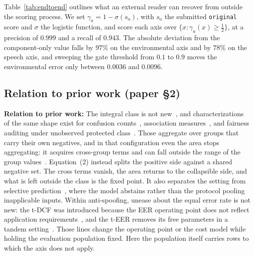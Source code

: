 \documentclass[10pt]{article}
\begin{document}
Table~\ref{tab:endtoend} outlines what an external reader can recover from outside the scoring
process. We set $\gamma_a = 1-\sigma(s_{\mathrm{o}})$, with $s_{\mathrm{o}}$ the submitted
\texttt{original} score and $\sigma$ the logistic function, and score each axis over $\{x:\gamma_a(x)\ge\tfrac12\}$, at a precision of $0.999$ and a recall of
$0.943$. The absolute deviation from the component-only value falls by $97\%$ on the environmental
axis and by $78\%$ on the speech axis, and sweeping the gate threshold from $0.1$ to $0.9$ moves the
environmental error only between $0.0036$ and $0.0096$.

\subsection*{Relation to prior work (paper \S2)}

\noindent\textbf{Relation to prior work: } The integral class is not new~\cite{wieand1989}, and
characterizations of the same shape exist for confusion counts~\cite{prati2026}, association
measures~\cite{kenah2025}, and fairness auditing under unobserved protected
class~\cite{kallus2019}. Those aggregate over groups that carry their own negatives, and in that
configuration even the area stops aggregating: it acquires cross-group terms and can fall outside the
range of the group values~\cite{matos2026}. Equation~(2) instead splits the positive side
against a shared negative set. The cross terms vanish, the area returns to the collapsible side, and
what is left outside the class is the fixed point. It also separates the setting from selective prediction~\cite{elyaniv2010}, where the model
abstains rather than the protocol pooling inapplicable inputs. Within anti-spoofing, unease about
the equal error rate is not new: the t-DCF was introduced because the EER operating point does not
reflect application requirements~\cite{kinnunen2020tdcf}, and the t-EER removes its free parameters
in a tandem setting~\cite{kinnunen2024teer}. Those lines change the operating point or the cost
model while holding the evaluation population fixed. Here the population itself carries rows to
which the axis does not apply.
\end{document}

